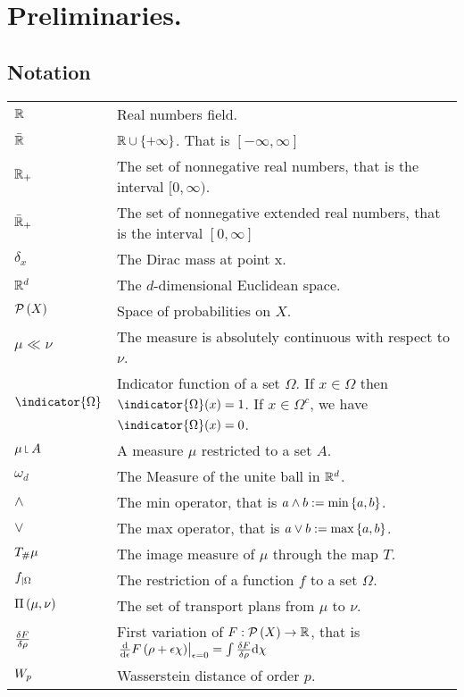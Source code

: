 \chapter{Preliminaries.}
\section{Notation}
\begin{tabular}{ l l }
	$\mathbb{R}$ & Real numbers field. \\ 
	$\bar{\mathbb{R}}$ & $ \mathbb{R} \cup \left\lbrace +\infty \right\rbrace$. That is $[-\infty, \infty]$ \\
	$\mathbb{R}_+ $ & The set of nonnegative real numbers, that is the interval $[0, \infty)$.\\
	$\bar{\mathbb{R}}_+$ & The set of nonnegative extended real numbers, that is the interval $[0, \infty]$\\
	$\delta_x$ & The Dirac mass at point x. \\
	$\mathbb{R}^d $ & The $d$-dimensional Euclidean space.\\
	$\mathcal{P}\left( X \right)$ & Space of probabilities on $X$. \\	
	$\mu \ll\nu$ & The measure is absolutely continuous with respect to $\nu$. \\
	$\indicator{\Omega} $ & Indicator function of a set $\Omega$. If $x\in \Omega$ then $\indicator{\Omega}(x)=1$. If $x\in \Omega^c$, we have $\indicator{\Omega}(x)=0$.\\
	$\mu \measurerestr A$ & A measure $\mu$ restricted to a set $A$.\\
	$\omega_d$ & The Measure of the unite ball in $\mathbb{R}^d$. \\
	$\wedge$ & The min operator, that is $a\wedge b:=\min\left\lbrace a,b \right\rbrace$. \\
	$\vee$ & The max operator, that is $a\vee b:=\max\left\lbrace a,b \right\rbrace$. \\
	$T_\# \mu$ &  The image measure of $\mu$ through the map $T$.\\
	${f}_{\left| \Omega \right.}$ & The restriction of a function $f$ to a set $\Omega$. \\
	$\Pi\left(\mu, \nu\right)$ & The set of transport plans from $\mu$ to $\nu$.\\
	$\frac{\delta F}{\delta \rho}$ &  First variation of $F:\mathcal{P}\left( X \right) \rightarrow \mathbb{R}$, that is $\left.\frac{\mathrm{d}}{\mathrm{d}\epsilon}F\left(\rho +\epsilon\chi\right)\right|_{\epsilon=0}=\int\frac{\delta F}{\delta \rho}\mathrm{d}\chi$\\
	$W_{p}$ & Wasserstein distance of order $p$. \\	

\end{tabular}
